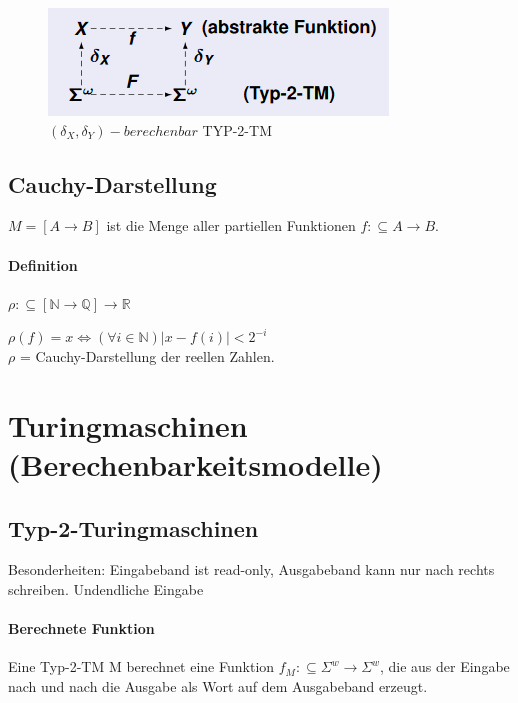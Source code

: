 \documentclass[ngerman]{scrartcl}
\begin{document}
\begin{figure}[h]
  \centering
  \includegraphics{typ2name.PNG}
  \caption{$ (\delta_X, \delta_Y)-berechenbar$ TYP-2-TM}
\end{figure}

\subsection{Cauchy-Darstellung}
$ M = [A \rightarrow B] $ ist die Menge aller partiellen Funktionen $ f : \subseteq A \rightarrow B $.

\paragraph{Definition} $ \rho : \subseteq[\mathbb{N}\rightarrow\mathbb{Q}] \rightarrow \mathbb{R}$

\begin{center}
  $ \rho(f) = x \Leftrightarrow (\forall i \in \mathbb{N})|x-f(i)|< 2^{-i}$ \\
  $ \rho $ = Cauchy-Darstellung der reellen Zahlen.
\end{center}

%
%
\section{Turingmaschinen (Berechenbarkeitsmodelle)}

\subsection{Typ-2-Turingmaschinen}
Besonderheiten: Eingabeband ist read-only, Ausgabeband kann nur nach rechts schreiben. Undendliche Eingabe

\paragraph{Berechnete Funktion}
Eine Typ-2-TM M berechnet eine Funktion $ f_M: \subseteq \Sigma^w \rightarrow \Sigma^w $, die aus der Eingabe nach und nach die Ausgabe als Wort auf dem Ausgabeband erzeugt.
\end{document}
